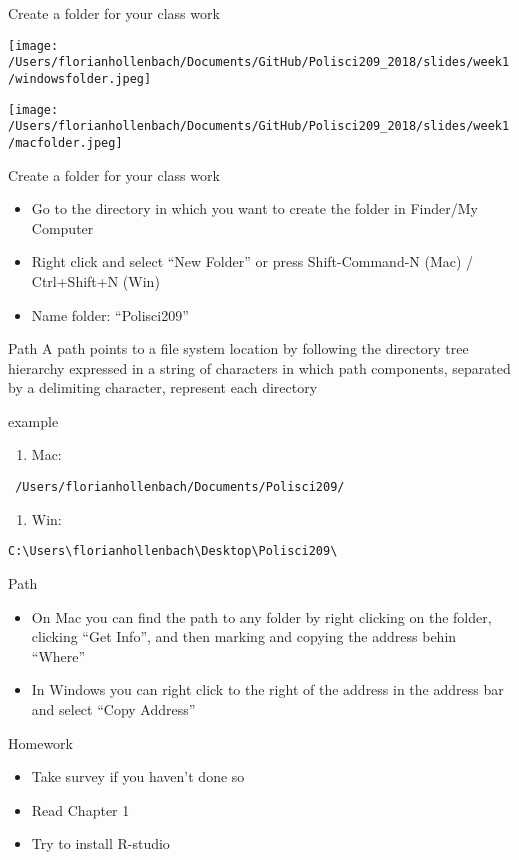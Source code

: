 \documentclass[presentation]{beamer}
\begin{document}
\begin{frame}[label={sec:org6cc33eb}]{Create a folder for your class work}
\begin{center}
\texttt{[image: /Users/florianhollenbach/Documents/GitHub/Polisci209\_2018/slides/week1/windowsfolder.jpeg]}
\end{center}

\begin{center}
\texttt{[image: /Users/florianhollenbach/Documents/GitHub/Polisci209\_2018/slides/week1/macfolder.jpeg]}
\end{center}
\end{frame}

\begin{frame}[label={sec:orga7f3c7d}]{Create a folder for your class work}
\begin{itemize}
\item Go to the directory in which you want to create the folder in Finder/My Computer
\item Right click and select ``New Folder'' or press Shift-Command-N (Mac) / Ctrl+Shift+N (Win)
\item Name folder: ``Polisci209''
\end{itemize}
\end{frame}

\begin{frame}[fragile,label={sec:orgac30e63}]{Path}
 A path points to a file system location by following the directory tree hierarchy expressed in a string of characters in which path components, separated by a delimiting character, represent each directory

example
\begin{enumerate}
\item Mac:
\end{enumerate}
\begin{verbatim}
 /Users/florianhollenbach/Documents/Polisci209/
\end{verbatim}
\begin{enumerate}
\item Win:
\end{enumerate}
\begin{verbatim}
C:\Users\florianhollenbach\Desktop\Polisci209\
\end{verbatim}
\end{frame}


\begin{frame}[label={sec:org90f0dde}]{Path}
\begin{itemize}
\item On Mac you can find the path to any folder by right clicking on the folder, clicking ``Get Info'', and then marking and copying the address behin ``Where''

\item In Windows you can right click to the right of the address in the address bar and select ``Copy Address''
\end{itemize}
\end{frame}


\begin{frame}[label={sec:org20e875a}]{Homework}
\begin{itemize}
\item Take survey if you haven't done so
\item Read Chapter 1
\item Try to install R-studio
\end{itemize}
\end{frame}
\end{document}
